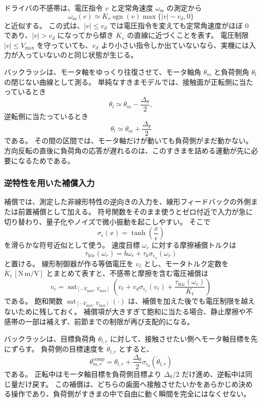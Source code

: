 ドライバの不感帯は、電圧指令 $v$ と定常角速度 $\omega_{\mathrm{ss}}$ の測定から
\[
  \omega_{\mathrm{ss}}(v)
  \simeq
  K_v\operatorname{sgn}(v)\max\{|v|-v_d,0\}
\]
と近似する。
この式は、$|v|\leq v_d$ では電圧指令を変えても定常角速度がほぼ 0 であり、$|v|>v_d$ になってから傾き $K_v$ の直線に近づくことを表す。
電圧制限 $|v|\leq V_{\max}$ を守っていても、$v_d$ より小さい指令しか出ていないなら、実機には入力が入っていないのと同じ状態が生じる。

バックラッシは、モータ軸をゆっくり往復させて、モータ軸角 $\theta_m$ と負荷側角 $\theta_l$ の閉じない曲線として測る。
単純なすきまモデルでは、接触面が正転側に当たっているとき
\[
  \theta_l\simeq \theta_m-\frac{\Delta_\theta}{2},
\]
逆転側に当たっているとき
\[
  \theta_l\simeq \theta_m+\frac{\Delta_\theta}{2}
\]
である。
その間の区間では、モータ軸だけが動いても負荷側がまだ動かない。
方向反転の直後に負荷角の応答が遅れるのは、このすきまを詰める運動が先に必要になるためである。

\subsubsection{逆特性を用いた補償入力}

補償では、測定した非線形特性の逆向きの入力を、線形フィードバックの外側または前置補償として加える。
符号関数をそのまま使うとゼロ付近で入力が急に切り替わり、量子化やノイズで微小振動を起こしやすい。
そこで
\[
  \sigma_\epsilon(x)=\tanh\left(\frac{x}{\epsilon}\right)
\]
を滑らかな符号近似として使う。
速度目標 $\omega_r$ に対する摩擦補償トルクは
\[
  \tau_{\mathrm{fric}}(\omega_r)
  =b\omega_r+\tau_k\sigma_{\epsilon_\omega}(\omega_r)
\]
と置ける。
線形制御器が作る等価電圧を $v_\ell$ とし、モータトルク定数を $K_t\,[\mathrm{N\,m/V}]$ とまとめて表すと、不感帯と摩擦を含む電圧補償は
\[
  v_c
  =
  \operatorname{sat}_{[-V_{\max},\,V_{\max}]}
  \left(
    v_\ell
    +v_d\sigma_{\epsilon_v}(v_\ell)
    +\frac{\tau_{\mathrm{fric}}(\omega_r)}{K_t}
  \right)
\]
である。
飽和関数 $\operatorname{sat}_{[-V_{\max},\,V_{\max}]}(\cdot)$ は、補償を加えた後でも電圧制限を越えないために残しておく。
補償項が大きすぎて飽和に当たる場合、静止摩擦や不感帯の一部は補えず、前節までの制限が再び支配的になる。

バックラッシは、目標負荷角 $\theta_{l,r}$ に対して、接触させたい側へモータ軸目標を先にずらす。
負荷側の目標速度を $\dot{\theta}_{l,r}$ とすると、
\[
  \theta_{m,r}^{\mathrm{comp}}
  =
  \theta_{l,r}
  +\frac{\Delta_\theta}{2}
  \sigma_{\epsilon_\theta}(\dot{\theta}_{l,r})
\]
である。
正転中はモータ軸目標を負荷側目標より $\Delta_\theta/2$ だけ進め、逆転中は同じ量だけ戻す。
この補償は、どちらの歯面へ接触させたいかをあらかじめ決める操作であり、負荷側がすきまの中で自由に動く瞬間を完全にはなくせない。

